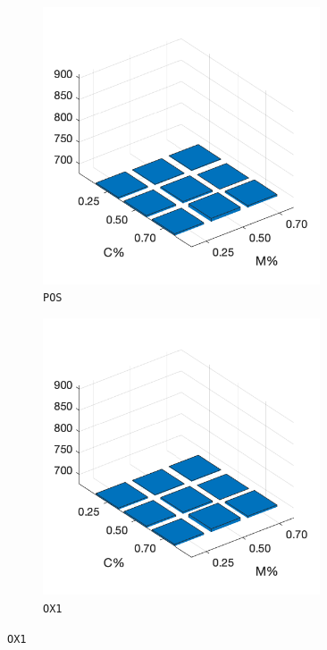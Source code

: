 \begin{figure}
\begin{subfigure}[b]{0.25\textwidth}
		\includegraphics[width=0.9\textwidth]{crossover/cross_unnamed_1.png}
		\caption{\texttt{POS}}
		\label{fig:y}
    	\end{subfigure}
%
	\begin{subfigure}[b]{0.25\textwidth}
		\centering
		\includegraphics[width=0.9\textwidth]{crossover/cross_unnamed_1.png}
		\caption{\texttt{OX1}}
		\label{fig:z}
    	\end{subfigure}

\end{figure}
